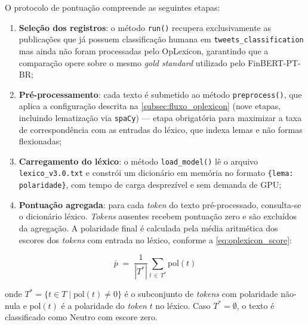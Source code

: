 O protocolo de pontuação compreende as seguintes etapas:

\begin{enumerate}
	\item \textbf{Seleção dos registros}: o método \texttt{run()} recupera exclusivamente as publicações que já possuem classificação humana em \texttt{tweets\_classification} mas ainda não foram processadas pelo OpLexicon, garantindo que a comparação opere sobre o mesmo 	\textit{gold standard} utilizado pelo FinBERT-PT-BR;
		
	\item \textbf{Pré-processamento}: cada texto é submetido ao método \texttt{preprocess()}, que aplica a configuração descrita na \autoref{subsec:fluxo_oplexicon} (nove etapas, incluindo lematização via \texttt{spaCy}) — etapa obrigatória para maximizar a taxa de correspondência com as entradas do léxico, que indexa lemas e não formas flexionadas;
	
	\item \textbf{Carregamento do léxico}: o método \texttt{load\_model()} lê o arquivo \texttt{lexico\_v3.0.txt} e constrói um dicionário em memória no formato \texttt{\{lema: polaridade\}}, com tempo de carga desprezível e sem demanda de GPU;
	
	\item \textbf{Pontuação agregada}: para cada \textit{token} do texto pré-processado, consulta-se o dicionário léxico. \textit{Tokens} ausentes recebem pontuação zero e são excluídos da agregação. A polaridade final é calculada pela média aritmética dos escores dos \textit{tokens} com entrada no léxico, conforme a \autoref{eq:oplexicon_score}:
\end{enumerate}

\begin{equation}
	\label{eq:oplexicon_score}
	\bar{p} \;=\; \frac{1}{|T^{*}|} \sum_{t \,\in\, T^{*}} \mathrm{pol}(t)
\end{equation}

\noindent onde $T^{*} = \{t \in T \mid \mathrm{pol}(t) \neq 0\}$ é o subconjunto de \textit{tokens} com polaridade não-nula e $\mathrm{pol}(t)$ é a polaridade do \textit{token} $t$
no léxico. Caso $T^{*} = \emptyset$, o texto é classificado como Neutro com escore zero.

